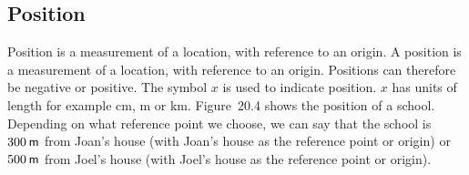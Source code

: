             \subsection*{Position}
            \nopagebreak
{} { Position is a measurement of a location, with reference to an origin.  } 
        \label{m38787*id62737}A position is a measurement of a location, with reference to an origin. Positions can therefore be negative or positive. The symbol $x$ is used to indicate position. $x$ has units of length for example cm, m or km.
Figure~20.4 shows the position of a school. Depending on what reference point we choose, we can say that the school is $300\phantom{\rule{2pt}{0ex}}\mathsf{m}$ from Joan's house (with Joan's house as the reference point or origin) or  $500\phantom{\rule{2pt}{0ex}}\mathsf{m}$ from Joel's house (with Joel's house as the reference point or origin).\par 
    \setcounter{subfigure}{0}
